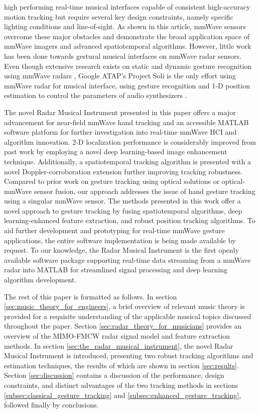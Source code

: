 \documentclass[10pt,journal,final]{IEEEtran}
\begin{document}
high performing real-time musical interfaces capable of consistent high-accuracy motion tracking but require several key design constraints, namely specific lighting conditions and line-of-sight. As shown in this article, mmWave sensors overcome these major obstacles and demonstrate the broad application space of mmWave imagers and advanced spatiotemporal algorithms.  However, little work has been done towards gestural musical interfaces on mmWave radar sensors. Even though extensive research exists on static and dynamic gesture recognition using mmWave radars \cite{josiah:hand_gesture_recognition,intro:gestureRecognition}, Google ATAP's Project Soli is the only effort using mmWave radar for musical interface, using gesture recognition and 1-D position estimation to control the parameters of audio synthesizers \cite{intro:soli_musical_instrument}. 

The novel Radar Musical Instrument presented in this paper offers a major advancement for near-field mmWave hand tracking and an accessible MATLAB software platform for further investigation into real-time mmWave HCI and algorithm innovation. 2-D localization performance is considerably improved from past work \cite{mmWave_tracking:WiDeo} by employing a novel deep learning-based image enhancement technique. Additionally, a spatiotemporal tracking algorithm is presented with a novel Doppler-corroboration extension further improving tracking robustness. Compared to prior work on gesture tracking using optical solutions \cite{optical_tracking:kinect,polfreman2011multi,jensenius2013kinectofon,han2014lessons,hantrakul2014implementations,intro:RGBcamera} or optical-mmWave \cite{mmWave_tracking:ThuMouse} sensor fusion, our approach addresses the issue of hand gesture tracking using a singular mmWave sensor. The methods presented in this work offer a novel approach to gesture tracking by fusing spatiotemporal algorithms, deep learning-enhanced feature extraction, and robust position tracking algorithms. To aid further development and prototyping for real-time mmWave gesture applications, the entire software implementation is being made available by request. To our knowledge, the Radar Musical Instrument is the first openly available software package supporting real-time data streaming from a mmWave radar into MATLAB for streamlined signal processing and deep learning algorithm development. 

The rest of this paper is formatted as follows. In section \ref{sec:music_theory_for_engineers}, a brief overview of relevant music theory is provided for a requisite understanding of the applicable musical topics discussed throughout the paper. Section \ref{sec:radar_theory_for_musicians} provides an overview of the MIMO-FMCW radar signal model and feature extraction methods. In section \ref{sec:the_radar_musical_instrument}, the novel Radar Musical Instrument is introduced, presenting two robust tracking algorithms and estimation techniques, the results of which are shown in section \ref{sec:results}. Section \ref{sec:discussion} contains a discussion of the performance, design constraints, and distinct advantages of the two tracking methods in sections \ref{subsec:classical_gesture_tracking} and \ref{subsec:enhanced_gesture_tracking}, followed finally by conclusions.
\end{document}
